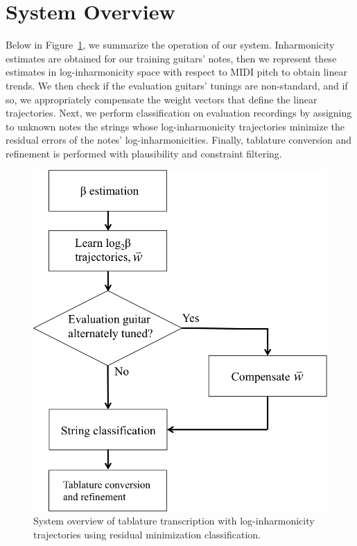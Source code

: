 \documentclass[12pt]{cmuthesis}
\begin{document}
\section{System Overview}
Below in Figure~\ref{fig:overview}, we summarize the operation of our system. Inharmonicity estimates are obtained for our training guitars' notes, then we represent these estimates in log-inharmonicity space with respect to MIDI pitch to obtain linear trends. We then check if the evaluation guitars' tunings are non-standard, and if so, we appropriately compensate the weight vectors that define the linear trajectories. Next, we perform classification on evaluation recordings by assigning to unknown notes the strings whose log-inharmonicity trajectories minimize the residual errors of the notes' log-inharmonicities. Finally, tablature conversion and refinement is performed with plausibility and constraint filtering.
\begin{figure}[!htbp] 
\label{fig:overview}
\centering
\includegraphics[scale=0.6]{overview}
\caption{System overview of tablature transcription with log-inharmonicity trajectories using residual minimization classification.}
\end{figure}
\end{document}

